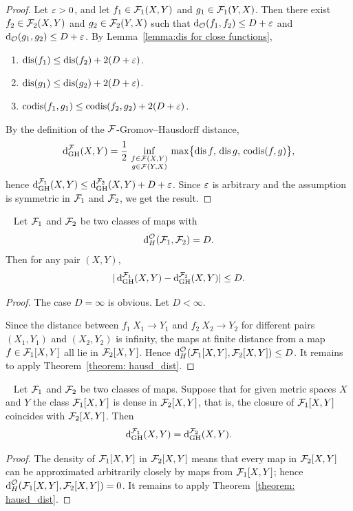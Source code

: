 \begin{proof}
  Let ${\varepsilon} > 0$, and let $f_1 \in \mathcal{F}_1(X,Y)$ and $g_1 \in \mathcal{F}_1(Y,X)$.
  Then there exist $f_2 \in \mathcal{F}_2(X,Y)$ and $g_2 \in \mathcal{F}_2(Y,X)$ such that $\operatorname{d}_{\mathcal{O}}(f_1, f_2) \leq D + {\varepsilon}$ and $\operatorname{d}_{\mathcal{O}}(g_1, g_2) \leq D + {\varepsilon}$.
    By Lemma~\ref{lemma:dis for close functions},
    \begin{enumerate}
      \item $\operatorname{dis}(f_1) \leq \operatorname{dis}(f_2) + 2(D + {\varepsilon})$.
      \item $\operatorname{dis}(g_1) \leq \operatorname{dis}(g_2) + 2(D + {\varepsilon})$.
      \item $\operatorname{codis}(f_1, g_1) \leq \operatorname{codis}(f_2, g_2) + 2(D + {\varepsilon})$.
    \end{enumerate}
    By the definition of the $\mathcal{F}$-Gromov--Hausdorff distance,
    $$
    \operatorname{d}^{\mathcal{F}}_{\mathrm{GH}}(X,Y)=\frac12\,\inf_{\substack{f\in \mathcal{F}(X,Y)\\ g\in \mathcal{F}(Y,X)}}\,\max\bigl\{\operatorname{dis} f,\,\operatorname{dis} g,\,\operatorname{codis}(f,g)\bigr\},
    $$ 
    hence $\operatorname{d}^{\mathcal{F}_1}_{\mathrm{GH}}(X,Y) \le \operatorname{d}^{\mathcal{F}_2}_{\mathrm{GH}}(X,Y) + D + {\varepsilon}$.
    Since ${\varepsilon}$ is arbitrary and the assumption is symmetric in $\mathcal{F}_1$ and $\mathcal{F}_2$, we get the result.
\end{proof}

\begin{corol}~\label{corol: hausd_dist_ext}
    Let $\mathcal{F}_1$ and $\mathcal{F}_2$ be two classes of maps with
  $$
  \operatorname{d}_{H}^{\mathcal{O}}(\mathcal{F}_1, \mathcal{F}_2) = D.
  $$
  Then for any pair $(X, Y)$,
  $$
    |\operatorname{d}^{\mathcal{F}_1}_{\mathrm{GH}}(X,Y) - \operatorname{d}^{\mathcal{F}_2}_{\mathrm{GH}}(X,Y)| \le D.
  $$
\end{corol}
\begin{proof}
  The case $D = \infty$ is obvious. Let $D < \infty$.\par
  Since the distance between $f_1 \: X_1 \to Y_1$ and $f_2 \: X_2 \to Y_2$ for different pairs $(X_1, Y_1)$ and $(X_2, Y_2)$ is infinity, the maps at finite distance from a map $f \in \mathcal{F}_1[X,Y]$ all lie in $\mathcal{F}_2[X,Y]$.
  Hence $\operatorname{d}_{H}^{\mathcal{O}}(\mathcal{F}_1[X,Y], \mathcal{F}_2[X,Y]) \leq D$. 
  It remains to apply Theorem~\ref{theorem: hausd_dist}.
\end{proof}
\begin{corol}~\label{corol: close_function_class}
  Let $\mathcal{F}_1$ and $\mathcal{F}_2$ be two classes of maps.
Suppose that for given metric spaces $X$ and $Y$ the class $\mathcal{F}_1[X,Y]$ is dense in $\mathcal{F}_2[X,Y]$, that is, the closure of $\mathcal{F}_1[X,Y]$ coincides with $\mathcal{F}_2[X,Y]$.
  Then
  $$
    \operatorname{d}^{\mathcal{F}_1}_{\mathrm{GH}}(X,Y) = \operatorname{d}^{\mathcal{F}_2}_{\mathrm{GH}}(X,Y).
  $$
\end{corol}

\begin{proof}
  The density of $\mathcal{F}_1[X,Y]$ in $\mathcal{F}_2[X,Y]$ means that every map in $\mathcal{F}_2[X,Y]$ can be approximated arbitrarily closely by maps from $\mathcal{F}_1[X,Y]$; hence $\operatorname{d}_{H}^{\mathcal{O}}(\mathcal{F}_1[X,Y], \mathcal{F}_2[X,Y]) = 0$.
  It remains to apply Theorem~\ref{theorem: hausd_dist}.
\end{proof}
